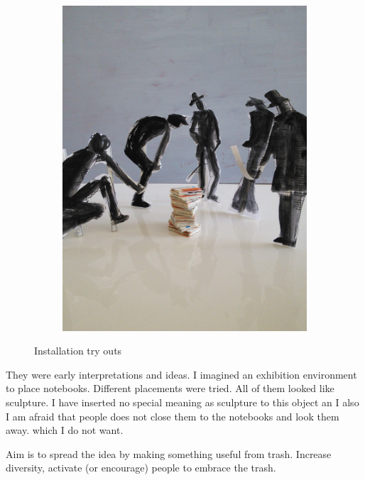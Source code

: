 {\begin{figure}
\begin{subfigure}[b]{0.3\textwidth}
        \includegraphics[width=\textwidth]{project_graphics/exhibition3.jpg}
        \label{fig:exhibition3}
    \end{subfigure}
    \caption{Installation try outs}
    \label{fig:exhibition}
\end{figure}

They were early interpretations and ideas. I imagined an exhibition environment to place notebooks. Different placements were tried. All of them looked like sculpture. I have inserted no special meaning as sculpture to this object an I also I am afraid that people does not close them to the notebooks and look them away. which I do not want.

Aim is to spread the idea by making something useful from trash. Increase diversity, activate (or encourage) people to embrace the trash.


}
